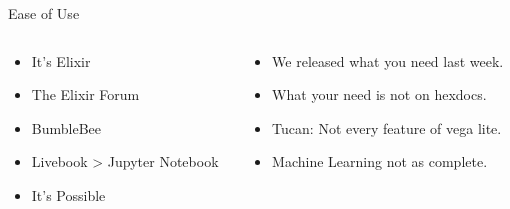 
\begin{frame}{Ease of Use}
	\begin{columns}
	\begin{column}{0.50\textwidth}
		\begin{tcolorbox}[enhanced jigsaw, colback=white, opacityback=.4, colframe=ElixirPurple, arc=3mm, boxrule=0mm, height=0.8\textheight, valign=center, title=The Good]

			
			\begin{itemize}
				\item It's Elixir
				\item The Elixir Forum
				\item BumbleBee
				\item Livebook > Jupyter Notebook
				\item It's Possible
				
			\end{itemize}

		\end{tcolorbox}
	\end{column}
	
	\begin{column}{0.6\textwidth}
		\begin{tcolorbox}[enhanced jigsaw, colback=white, opacityback=.4, colframe=ElixirPurple, arc=3mm, boxrule=0mm, height=0.8\textheight, valign=center, title=The Enhancing]
			
			\begin{itemize}
				\item We released what you need last week.
				\item What your need is not on hexdocs.
				\item Tucan: Not every feature of vega lite.
				\item Machine Learning not as complete.

			\end{itemize}

		\end{tcolorbox}
	\end{column}
	\end{columns}
\end{frame}